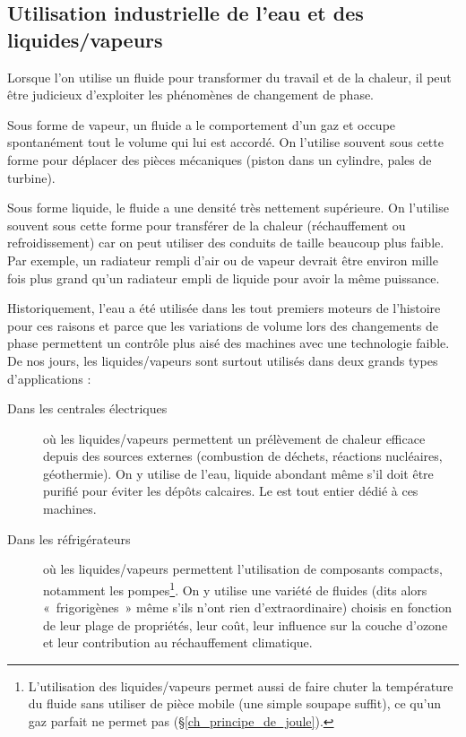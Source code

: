 	\subsection{Utilisation industrielle de l’eau et des \mbox{liquides/vapeurs}}
	
		Lorsque l’on utilise un fluide pour transformer du travail et de la chaleur, il peut être judicieux d’exploiter les phénomènes de changement de phase.

		Sous forme de vapeur, un fluide a le comportement d’un gaz et occupe spontanément tout le volume qui lui est accordé. On l’utilise souvent sous cette forme pour déplacer des pièces mécaniques (piston dans un cylindre, pales de turbine).
		
		Sous forme liquide, le fluide a une densité très nettement supérieure. On l’utilise souvent sous cette forme pour transférer de la chaleur (réchauffement ou refroidissement) car on peut utiliser des conduits de taille beaucoup plus faible. Par exemple, un radiateur rempli d’air ou de vapeur devrait être environ mille fois plus grand qu’un radiateur empli de liquide pour avoir la même puissance.
		
		Historiquement, l’eau a été utilisée dans les tout premiers moteurs de l’histoire pour ces raisons et parce que les variations de volume lors des changements de phase permettent un contrôle plus aisé des machines avec une technologie faible. De nos jours, les liquides/vapeurs sont surtout utilisés dans deux grands types d’applications :
			\begin{description}
				\item [Dans les centrales électriques] où les liquides/vapeurs permettent un prélèvement de chaleur efficace depuis des sources externes (combustion de déchets, réactions nucléaires, géothermie). On y utilise de l’eau, liquide abondant même s’il doit être purifié pour éviter les dépôts calcaires. Le \coursneuf est tout entier dédié à ces machines.
				\item [Dans les réfrigérateurs] où les liquides/vapeurs permettent l’utilisation de composants compacts, notamment les pompes\footnote{L’utilisation des liquides/vapeurs permet aussi de faire chuter la température du fluide sans utiliser de pièce mobile (une simple soupape suffit), ce qu’un gaz parfait ne permet pas (\S\ref{ch_principe_de_joule}).}. On y utilise une variété de fluides (dits alors «~frigorigènes~» même s’ils n’ont rien d’extraordinaire) choisis en fonction de leur plage de propriétés, leur coût, leur influence sur la couche d’ozone et leur contribution au réchauffement climatique.
			\end{description}

